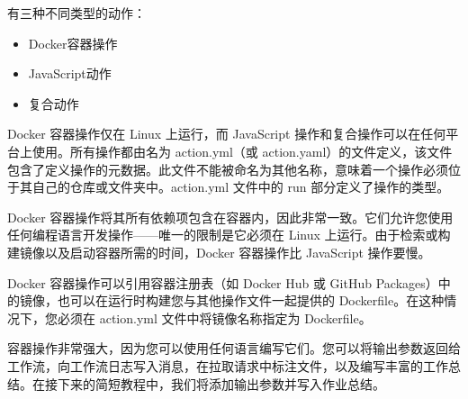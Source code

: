
有三种不同类型的动作：

\begin{itemize}
\item 
Docker容器操作

\item 
JavaScript动作

\item 
复合动作
\end{itemize}

Docker 容器操作仅在 Linux 上运行，而 JavaScript 操作和复合操作可以在任何平台上使用。所有操作都由名为 action.yml（或 action.yaml）的文件定义，该文件包含了定义操作的元数据。此文件不能被命名为其他名称，意味着一个操作必须位于其自己的仓库或文件夹中。action.yml 文件中的 run 部分定义了操作的类型。

Docker 容器操作将其所有依赖项包含在容器内，因此非常一致。它们允许您使用任何编程语言开发操作——唯一的限制是它必须在 Linux 上运行。由于检索或构建镜像以及启动容器所需的时间，Docker 容器操作比 JavaScript 操作要慢。

Docker 容器操作可以引用容器注册表（如 Docker Hub 或 GitHub Packages）中的镜像，也可以在运行时构建您与其他操作文件一起提供的 Dockerfile。在这种情况下，您必须在 action.yml 文件中将镜像名称指定为 Dockerfile。


容器操作非常强大，因为您可以使用任何语言编写它们。您可以将输出参数返回给工作流，向工作流日志写入消息，在拉取请求中标注文件，以及编写丰富的工作总结。在接下来的简短教程中，我们将添加输出参数并写入作业总结。